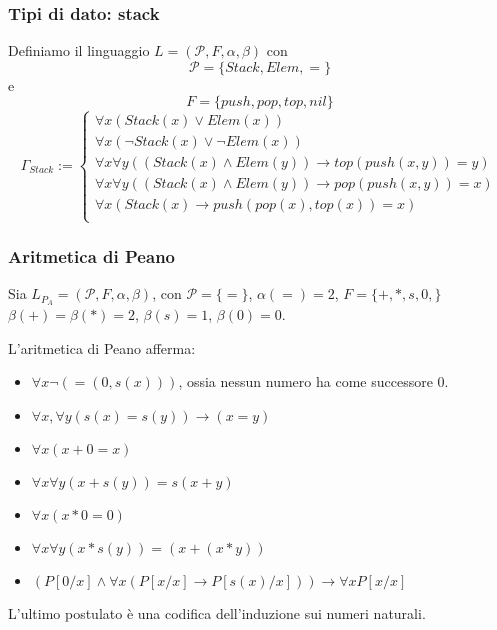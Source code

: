 \subsubsection{Tipi di dato: stack}
Definiamo il linguaggio $L= (\mathcal{P}, F, \alpha, \beta)$ 
con 
$$
\mathcal{P} = \{Stack, Elem, =\}
$$
e 
$$
F = \{push, pop, top, nil\}
$$
$$
        \Gamma_{Stack} := 
        \begin{cases}
                \forall x (Stack(x) \lor Elem(x)) \\
                \forall x (\neg Stack(x) \lor \neg Elem(x)) \\
                \forall x \forall y ((Stack(x) \land Elem(y)) \rightarrow top(push(x,y)) = y) \\
                \forall x \forall y ((Stack(x) \land Elem(y)) \rightarrow pop(push(x,y)) = x) \\
                \forall x (Stack(x) \rightarrow push(pop(x),top(x)) =x) \\
        \end{cases}
$$

\subsubsection{Aritmetica di Peano}

Sia $L_{P_A} = ( \mathcal{P}, F, \alpha, \beta)$, con 
$\mathcal{P} = \{=\}$, $\alpha(=) = 2$, $F =  \{ + , *, s, 0,\}$ 
$\beta(+) = \beta(*) = 2$, $\beta(s) = 1$, $\beta(0) =0$. 

L'aritmetica di Peano afferma: 
\begin{itemize}
        \item $\forall x \neg (=(0,s(x)))$, ossia nessun numero ha come successore $0$. 
        \item $\forall x, \forall y (s(x) = s(y)) \rightarrow (x = y)$
        \item $\forall x (x + 0 = x)$
        \item $\forall x \forall y (x + s(y)) = s(x+y)$
        \item $\forall x (x * 0 = 0)$
        \item $\forall x \forall y (x * s(y)) = (x + (x*y))$
        \item $(P[0/x] \land \forall x (P[x/x] \rightarrow P[s(x)/x])) \rightarrow \forall x P[x/x]$ 
\end{itemize}
L'ultimo postulato è una codifica dell'induzione sui numeri naturali. 
